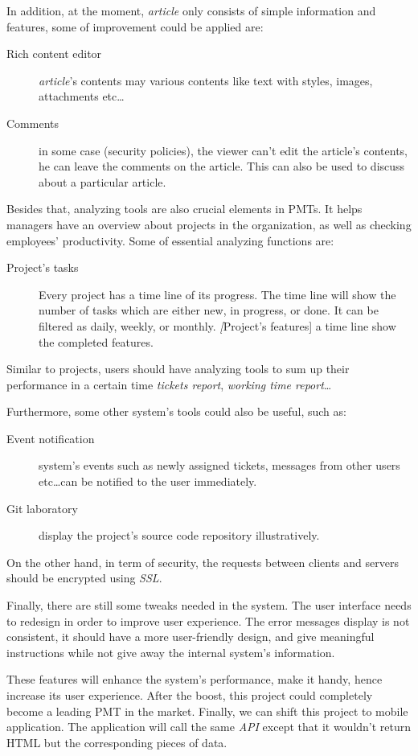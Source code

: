 In addition, at the moment, \emph{article} only consists of simple information and features, some of improvement could be applied are:
\begin{description}
\item[Rich content editor] \emph{article}'s contents may various contents like text with styles, images, attachments etc\dots
\item[Comments] in some case (\eg security policies), the viewer can't edit the article's contents, he can leave the comments on the article.
This can also be used to discuss about a particular article.
\end{description}

Besides that, analyzing tools are also crucial elements in PMTs.
It helps managers have an overview about projects in the organization, as well as checking employees' productivity.
Some of essential analyzing functions are:
\begin{description}
\item[Project's tasks] Every project has a time line of its progress.
The time line will show the number of tasks which are either new, in progress, or done.
It can be filtered as daily, weekly, or monthly.
\emph[Project's features] a time line show the completed features.
\end{description}
Similar to projects, users should have analyzing tools to sum up their performance in a certain time \eg \emph{tickets report}, \emph{working time report}\dots

Furthermore, some other system's tools could also be useful, such as:
\begin{description}
\item[Event notification] system's events such as newly assigned tickets, messages from other users etc\dots can be notified to the user immediately.
\item[Git laboratory] display the project's source code repository illustratively.
\end{description}

On the other hand, in term of security, the requests between clients and servers should be encrypted using \emph{SSL}.

Finally, there are still some tweaks needed in the system.
The user interface needs to redesign in order to improve user experience.
The error messages display is not consistent, it should have a more user-friendly design, and give meaningful instructions while not give away the internal system's information.

These features will enhance the system's performance, make it handy, hence increase its user experience.
After the boost, this project could completely become a leading PMT in the market.
Finally, we can shift this project to mobile application. 
The application will call the same \emph{API} except that it wouldn't return HTML but the corresponding pieces of data.
